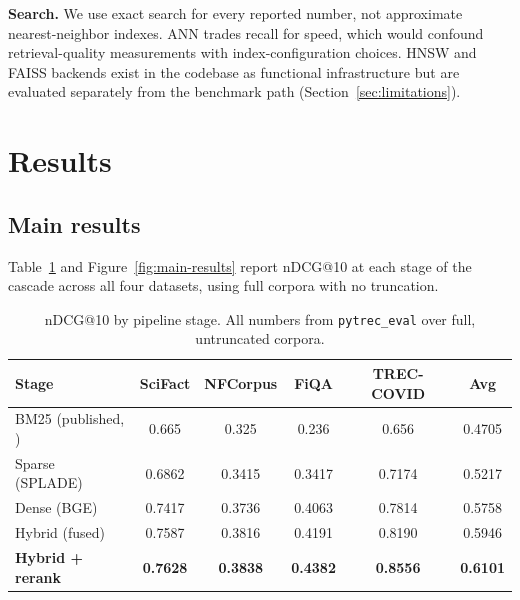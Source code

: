 \documentclass[11pt]{article}
\begin{document}
\textbf{Search.} We use exact search for every reported number, not approximate nearest-neighbor indexes. ANN trades recall for speed, which would confound retrieval-quality measurements with index-configuration choices. HNSW and FAISS backends exist in the codebase as functional infrastructure but are evaluated separately from the benchmark path (Section~\ref{sec:limitations}).

\section{Results}
\label{sec:results}

\subsection{Main results}

Table~\ref{tab:main} and Figure~\ref{fig:main-results} report nDCG@10 at each stage of the cascade across all four datasets, using full corpora with no truncation.

\begin{table}[h]
\centering
\caption{nDCG@10 by pipeline stage. All numbers from \texttt{pytrec\_eval} over full, untruncated corpora.}
\label{tab:main}
\begin{tabular}{lccccc}
\toprule
Stage & SciFact & NFCorpus & FiQA & TREC-COVID & Avg \\
\midrule
BM25 (published, \citealt{thakur2021beir}) & 0.665 & 0.325 & 0.236 & 0.656 & 0.4705 \\
Sparse (SPLADE) & 0.6862 & 0.3415 & 0.3417 & 0.7174 & 0.5217 \\
Dense (BGE) & 0.7417 & 0.3736 & 0.4063 & 0.7814 & 0.5758 \\
Hybrid (fused) & 0.7587 & 0.3816 & 0.4191 & 0.8190 & 0.5946 \\
\textbf{Hybrid + rerank} & \textbf{0.7628} & \textbf{0.3838} & \textbf{0.4382} & \textbf{0.8556} & \textbf{0.6101} \\
\bottomrule
\end{tabular}
\end{table}
\end{document}
